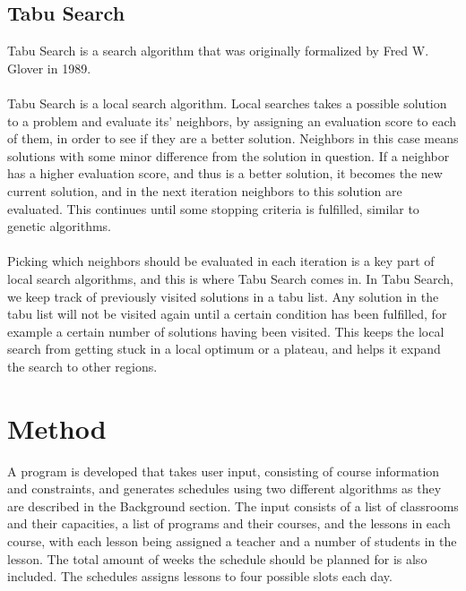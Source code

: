 \documentclass[titlepage,a4paper]{article}
\begin{document}
\subsection{Tabu Search}
Tabu Search is a search algorithm that was originally formalized by Fred W. Glover in 1989\cite{tabuSearch89}. \\\\
Tabu Search is a local search algorithm. Local searches takes a possible solution to a problem and evaluate its’ neighbors, by assigning an evaluation score to each of them, in order to see if they are a better solution. Neighbors in this case means solutions with some minor difference from the solution in question. If a neighbor has a higher evaluation score, and thus is a better solution, it becomes the new current solution, and in the next iteration neighbors to this solution are evaluated. This continues until some stopping criteria is fulfilled, similar to genetic algorithms. \\\\
Picking which neighbors should be evaluated in each iteration is a key part of local search algorithms, and this is where Tabu Search comes in.
In Tabu Search, we keep track of previously visited solutions in a tabu list. Any solution in the tabu list will not be visited again until a certain condition has been fulfilled, for example a certain number of solutions having been visited. This keeps the local search from getting stuck in a local optimum or a plateau, and helps it expand the search to other regions\cite{geneticVS99}. 

\pagebreak
\section{Method}
A program is developed that takes user input, consisting of course information and constraints, and generates schedules using two different algorithms as they are described in the Background section. The input consists of a list of classrooms and their capacities, a list of programs and their courses, and the lessons in each course, with each lesson being assigned a teacher and a number of students in the lesson. The total amount of weeks the schedule should be planned for is also included.
The schedules assigns lessons to four possible slots each day. \\\\
\end{document}
